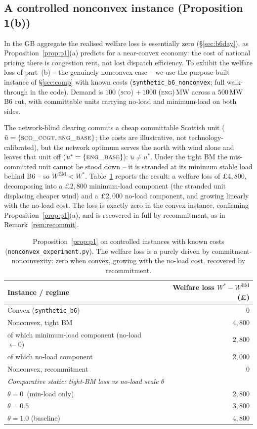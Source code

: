 \documentclass[review,3p,times]{elsarticle}
\theoremstyle{plain}
\theoremstyle{definition}
\begin{document}
\subsection{A controlled nonconvex instance (Proposition 1(b))}
\label{sec:nonconvex}

In the GB aggregate the realised welfare loss is essentially zero
(\S\ref{sec:b6day}), as Proposition~\ref{prop:p1}(a) predicts for a near-convex
economy: the cost of national pricing there is congestion rent, not lost dispatch
efficiency. To exhibit the welfare loss of part~(b) -- the genuinely nonconvex
case -- we use the purpose-built instance of \S\ref{sec:comp} with known costs
(\texttt{synthetic\_b6\_nonconvex}; full walk-through in the code). Demand is
$100$ (\textsc{sco}) $+\,1000$ (\textsc{eng})\,MW across a $500$\,MW B6 cut, with
committable units carrying no-load and minimum-load on both sides.

The network-blind clearing commits a cheap committable Scottish unit
($\tilde u=\{\textsc{sco\_ccgt},\textsc{eng\_base}\}$; the costs are illustrative,
not technology-calibrated), but the network optimum
serves the north with wind alone and leaves that unit off
($u^\ast=\{\textsc{eng\_base}\}$): $\tilde u\neq u^\ast$. Under the tight BM the
mis-committed unit cannot be stood down -- it is stranded at its minimum stable
load behind B6 -- so $W^{\mathrm{BM}}<W^\ast$. Table~\ref{tab:nonconvex} reports
the result: a welfare loss of $\pounds4{,}800$, decomposing into a $\pounds2{,}800$
minimum-load component (the stranded unit displacing cheaper wind) and a
$\pounds2{,}000$ no-load component, and growing linearly with the no-load cost.
The loss is exactly zero in the convex instance, confirming
Proposition~\ref{prop:p1}(a), and is recovered in full by recommitment, as in
Remark~\ref{rem:recommit}.

\begin{table}[t]
\centering
\caption{Proposition~\ref{prop:p1} on controlled instances with known costs
(\texttt{nonconvex\_experiment.py}). The welfare loss is a purely driven by
commitment-nonconvexity: zero when convex, growing with the no-load cost,
recovered by recommitment.}
\label{tab:nonconvex}
\begin{tabular}{lr}
\toprule
Instance / regime & Welfare loss $W^\ast-W^{\mathrm{BM}}$ (\pounds)\\
\midrule
Convex (\texttt{synthetic\_b6}) & $0$\\
\midrule
Nonconvex, tight BM & $4{,}800$\\
\quad of which minimum-load component (no-load $\leftarrow 0$) & $2{,}800$\\
\quad of which no-load component & $2{,}000$\\
Nonconvex, recommitment & $0$\\
\midrule
\multicolumn{2}{l}{\emph{Comparative static: tight-BM loss vs no-load scale $\theta$}}\\
$\theta=0$ \;\,(min-load only) & $2{,}800$\\
$\theta=0.5$ & $3{,}800$\\
$\theta=1.0$ \;(baseline) & $4{,}800$\\
\bottomrule
\end{tabular}
\end{table}
\end{document}
